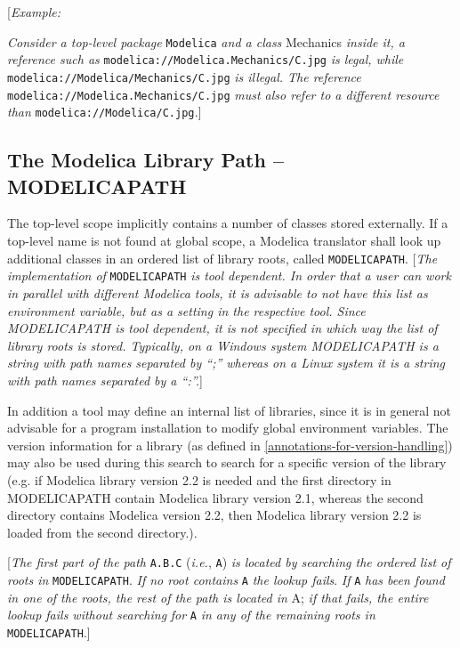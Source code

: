 {[}\emph{Example:}

\emph{Consider a top-level package} \lstinline!Modelica! \emph{and a class}
Mechanics \emph{inside it, a reference such as}
\lstinline!modelica://Modelica.Mechanics/C.jpg! \emph{is legal, while}
\lstinline!modelica://Modelica/Mechanics/C.jpg! \emph{is illegal. The reference}
\lstinline!modelica://Modelica.Mechanics/C.jpg! \emph{must also refer to a different
resource than} \lstinline!modelica://Modelica/C.jpg!\emph{.}{]}

\subsection{The Modelica Library Path -- MODELICAPATH}

The top-level scope implicitly contains a number of classes stored
externally. If a top-level name is not found at global scope, a Modelica
translator shall look up additional classes in an ordered list of
library roots, called \lstinline!MODELICAPATH!. {[}\emph{The implementation of}
\lstinline!MODELICAPATH! \emph{is tool dependent. In order that a user can work in
parallel with different Modelica tools, it is advisable to not have this
list as environment variable, but as a setting in the respective tool.
Since MODELICAPATH is tool dependent, it is not specified in which way
the list of library roots is stored. Typically, on a Windows system
MODELICAPATH is a string with path names separated by ``;'' whereas on a
Linux system it is a string with path names separated by a ``:''.}{]}

In addition a tool may define an internal list of libraries, since it is
in general not advisable for a program installation to modify global
environment variables. The version information for a library (as defined
in \autoref{annotations-for-version-handling}) may also be used during this search to search for a
specific version of the library (e.g. if Modelica library version 2.2 is
needed and the first directory in MODELICAPATH contain Modelica library
version 2.1, whereas the second directory contains Modelica version 2.2,
then Modelica library version 2.2 is loaded from the second directory.).

{[}\emph{The first part of the path} \lstinline!A.B.C! (\emph{i.e.}, \lstinline!A!) \emph{is
located by searching the ordered list of roots in} \lstinline!MODELICAPATH!.
\emph{If no root contains} \lstinline!A! \emph{the lookup fails}. \emph{If} \lstinline!A!
\emph{has been found in one of the roots, the rest of the path is
located in} A; \emph{if that fails, the entire lookup fails without
searching} \emph{for} \lstinline!A! \emph{in any of the remaining roots in}
\lstinline!MODELICAPATH!.{]}

